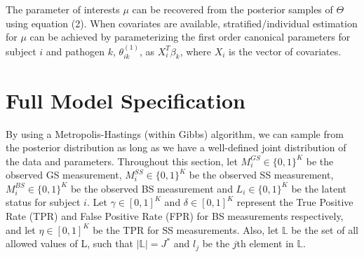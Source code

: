 \documentclass[11 pt, a4paper]{article}  %
\begin{document}
The parameter of interests $\mu$ can be recovered from the posterior samples of $\Theta$ using equation (2). When covariates are available, stratified/individual estimation for $\mu$ can be achieved by parameterizing the first order canonical parameters for subject $i$ and pathogen $k$, $\theta^{(1)}_{ik}$, as $X_i^T\beta_k$, where $X_i$ is the vector of covariates.

\section{Full Model Specification}
By using a Metropolis-Hastings (within Gibbs) algorithm, we can sample from the posterior distribution as long as we have a well-defined joint distribution of the data and parameters. Throughout this section, let $M_i^{GS} \in \{0,1\}^K$ be the observed GS measurement, $M_i^{SS} \in \{0,1\}^K$ be the observed SS measurement, $M_i^{BS} \in \{0,1\}^K$ be the observed BS measurement and $L_i \in \{0,1\}^K$ be the latent status for subject $i$. Let $\gamma \in [0,1]^K$ and $\delta \in [0,1]^K$ represent the True Positive Rate (TPR) and False Positive Rate (FPR) for BS measurements respectively, and let $\eta \in [0,1]^K$ be the TPR for SS measurements. Also, let $\mathbb{L}$ be the set of all allowed values of L, such that $|\mathbb{L}| = J^*$ and $l_j$ be the $j$th element in $\mathbb{L}$.
\end{document}
